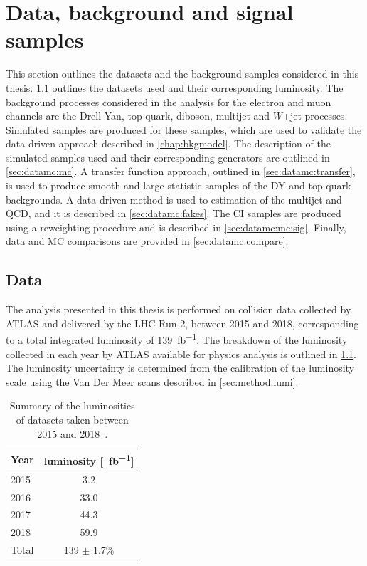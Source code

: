 \chapter{Data, background and signal samples}\label{chap:datamc}

This section outlines the datasets and the background samples considered in this thesis. \cref{sec:datamc:data} outlines the datasets used and their corresponding luminosity. The background processes considered in the analysis for the electron and muon channels are the Drell-Yan, top-quark, diboson, multijet and $W$+jet processes. Simulated samples are produced for these samples, which are used to validate the data-driven approach described in \cref{chap:bkgmodel}. The description of the simulated samples used and their corresponding generators are outlined in \cref{sec:datamc:mc}. A transfer function approach, outlined in \cref{sec:datamc:transfer}, is used to produce smooth and large-statistic samples of the DY and top-quark backgrounds. A data-driven method is used to estimation of the multijet and QCD, and it is described in \cref{sec:datamc:fakes}. The CI samples are produced using a reweighting procedure and is described in \cref{sec:datamc:mc:sig}. Finally, data and MC comparisons are provided in \cref{sec:datamc:compare}.


\section{Data}\label{sec:datamc:data}
The analysis presented in this thesis is performed on \emph{\protonproton} collision data collected by ATLAS and delivered by the LHC Run-2, between 2015 and 2018, corresponding to a total integrated luminosity of \SI{139}{\femto\barn^{-1}}. The breakdown of the luminosity collected in each year by ATLAS available for physics analysis is outlined in \cref{tab:data:lumi}. The luminosity uncertainty is determined from the calibration of the luminosity scale using the Van Der Meer scans described in \cref{sec:method:lumi}. 
\begin{table}[h]
    \centering
    \begin{tabular}{l|c}
        Year & luminosity [\SI{}{\femto\barn^{-1}}] \\
        \hline
        2015 & 3.2 \\
        2016 & 33.0 \\
        2017 & 44.3 \\
        2018 & 59.9 \\
        \hline 
        \hline
        Total & 139 $\pm$ 1.7\% \\
	\end{tabular}
    \caption[Summary of the luminosities of datasets taken between 2015 and 2018]{Summary of the luminosities of datasets taken between 2015 and 2018~\cite{ATLAS:lumiPlots}.}
    \label{tab:data:lumi}
  \end{table}


